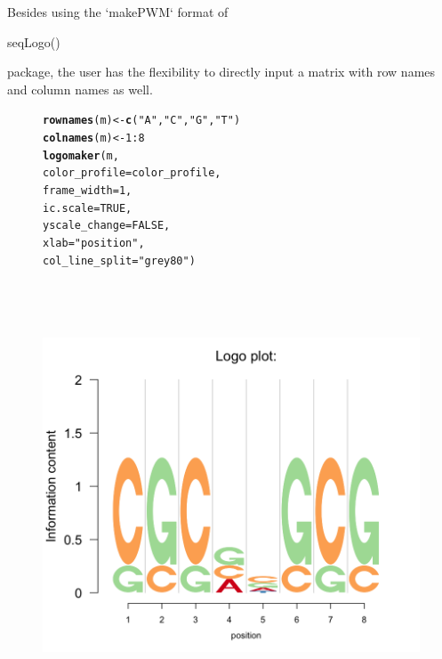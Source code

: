 \documentclass[12pt]{article}\usepackage[]{graphicx}\usepackage[usenames,dvipsnames]{color}
\makeatletter
\newcommand{\hlnum}[1]{\textcolor[rgb]{0.686,0.059,0.569}{#1}}%
\newcommand{\hlstr}[1]{\textcolor[rgb]{0.192,0.494,0.8}{#1}}%
\newcommand{\hlopt}[1]{\textcolor[rgb]{0,0,0}{#1}}%
\newcommand{\hlstd}[1]{\textcolor[rgb]{0.345,0.345,0.345}{#1}}%
\newcommand{\hlkwb}[1]{\textcolor[rgb]{0.69,0.353,0.396}{#1}}%
\newcommand{\hlkwc}[1]{\textcolor[rgb]{0.333,0.667,0.333}{#1}}%
\newcommand{\hlkwd}[1]{\textcolor[rgb]{0.737,0.353,0.396}{\textbf{#1}}}%
\newenvironment{kframe}{%
 \def\at@end@of@kframe{}%
 \ifinner\ifhmode%
  \def\at@end@of@kframe{\end{minipage}}%
  \begin{minipage}{\columnwidth}%
 \fi\fi%
 \def\FrameCommand##1{\hskip\@totalleftmargin \hskip-\fboxsep
 \colorbox{shadecolor}{##1}\hskip-\fboxsep
     \hskip-\linewidth \hskip-\@totalleftmargin \hskip\columnwidth}%
 \MakeFramed {\advance\hsize-\width
   \@totalleftmargin\z@ \linewidth\hsize
   \@setminipage}}%
 {\par\unskip\endMakeFramed%
 \at@end@of@kframe}
\newenvironment{knitrout}{}{} %
\makeatother
\begin{document}
Besides using the `makePWM` format of \begin{verb} seqLogo() \end{verb} package, the user has the flexibility to directly input a matrix with row names and column names as well.

\begin{figure}[h]
\begin{center}
\begin{knitrout}
\color{fgcolor}\begin{kframe}
\begin{alltt}
\hlkwd{rownames}\hlstd{(m)} \hlkwb{<-} \hlkwd{c}\hlstd{(}\hlstr{"A"}\hlstd{,} \hlstr{"C"}\hlstd{,} \hlstr{"G"}\hlstd{,} \hlstr{"T"}\hlstd{)}
\hlkwd{colnames}\hlstd{(m)} \hlkwb{<-} \hlnum{1}\hlopt{:}\hlnum{8}
\hlkwd{logomaker}\hlstd{(m,}
          \hlkwc{color_profile} \hlstd{= color_profile,}
          \hlkwc{frame_width} \hlstd{=} \hlnum{1}\hlstd{,}
          \hlkwc{ic.scale} \hlstd{=} \hlnum{TRUE}\hlstd{,}
          \hlkwc{yscale_change}\hlstd{=}\hlnum{FALSE}\hlstd{,}
          \hlkwc{xlab}\hlstd{=}\hlstr{"position"}\hlstd{,}
          \hlkwc{col_line_split} \hlstd{=} \hlstr{"grey80"}\hlstd{)}
\end{alltt}
\end{kframe}
\includegraphics[width=6in,height=5in]{figure/logolas_use-1} 

\end{knitrout}
\end{center}
\end{figure}
\end{document}
